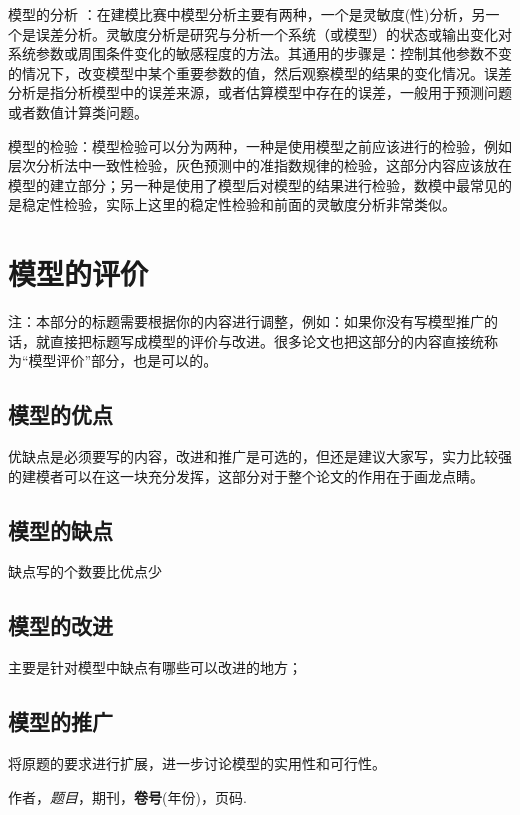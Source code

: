 模型的分析 ：在建模比赛中模型分析主要有两种，一个是灵敏度(性)分析，另一个是误差分析。灵敏度分析是研究与分析一个系统（或模型）的状态或输出变化对系统参数或周围条件变化的敏感程度的方法。其通用的步骤是：控制其他参数不变的情况下，改变模型中某个重要参数的值，然后观察模型的结果的变化情况。误差分析是指分析模型中的误差来源，或者估算模型中存在的误差，一般用于预测问题或者数值计算类问题。

模型的检验：模型检验可以分为两种，一种是使用模型之前应该进行的检验，例如层次分析法中一致性检验，灰色预测中的准指数规律的检验，这部分内容应该放在模型的建立部分；另一种是使用了模型后对模型的结果进行检验，数模中最常见的是稳定性检验，实际上这里的稳定性检验和前面的灵敏度分析非常类似。

\section{模型的评价}
注：本部分的标题需要根据你的内容进行调整，例如：如果你没有写模型推广的话，就直接把标题写成模型的评价与改进。很多论文也把这部分的内容直接统称为“模型评价”部分，也是可以的。

\subsection{模型的优点}
优缺点是必须要写的内容，改进和推广是可选的，但还是建议大家写，实力比较强的建模者可以在这一块充分发挥，这部分对于整个论文的作用在于画龙点睛。
\subsection{模型的缺点}
缺点写的个数要比优点少
\subsection{模型的改进}
主要是针对模型中缺点有哪些可以改进的地方\cite{risken1996fokker}；
\subsection{模型的推广}
将原题的要求进行扩展\cite{rossler1979equation}，进一步讨论模型的实用性和可行性\cite{mckean1970nagumo}。



\begin{thebibliography}{60}
	 作者，\emph{题目}，期刊，\textbf{卷号}(年份)，页码.
\end{thebibliography}

